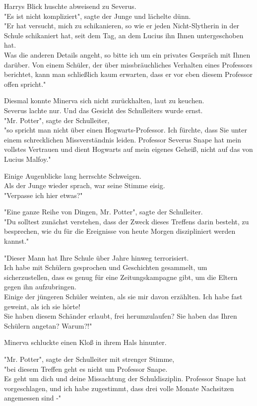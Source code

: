 {Harrys Blick huschte abweisend zu Severus.\\ "Es ist nicht kompliziert", sagte der Junge und lächelte dünn.\\ "Er hat versucht, mich zu schikanieren, so wie er jeden Nicht-Slytherin in der Schule schikaniert hat, seit dem Tag, an dem Lucius ihn Ihnen untergeschoben hat.\\ Was die anderen Details angeht, so bitte ich um ein privates Gespräch mit Ihnen darüber. Von einem Schüler, der über missbräuchliches Verhalten eines Professors berichtet, kann man schließlich kaum erwarten, dass er vor eben diesem Professor offen spricht."

Diesmal konnte Minerva sich nicht zurückhalten, laut zu keuchen.\\ Severus lachte nur. Und das Gesicht des Schulleiters wurde ernst.\\ "Mr. Potter", sagte der Schulleiter,\\ "so spricht man nicht über einen Hogwarts-Professor. Ich fürchte, dass Sie unter einem schrecklichen Missverständnis leiden. Professor Severus Snape hat mein vollstes Vertrauen und dient Hogwarts auf mein eigenes Geheiß, nicht auf das von Lucius Malfoy."

Einige Augenblicke lang herrschte Schweigen.\\ Als der Junge wieder sprach, war seine Stimme eisig.\\ "Verpasse ich hier etwas?"

"Eine ganze Reihe von Dingen, Mr. Potter", sagte der Schulleiter.\\ "Du solltest zunächst verstehen, dass der Zweck dieses Treffens darin besteht, zu besprechen, wie du für die Ereignisse von heute Morgen diszipliniert werden kannst."

"Dieser Mann hat Ihre Schule über Jahre hinweg terrorisiert.\\ Ich habe mit Schülern gesprochen und Geschichten gesammelt, um sicherzustellen, dass es genug für eine Zeitungskampagne gibt, um die Eltern gegen ihn aufzubringen.\\ Einige der jüngeren Schüler weinten, als sie mir davon erzählten. Ich habe fast geweint, als ich sie hörte!\\ Sie haben diesem Schänder erlaubt, frei herumzulaufen? Sie haben das Ihren Schülern angetan? Warum?!"

Minerva schluckte einen Kloß in ihrem Hals hinunter.

"Mr. Potter", sagte der Schulleiter mit strenger Stimme,\\ "bei diesem Treffen geht es nicht um Professor Snape.\\ Es geht um dich und deine Missachtung der Schuldisziplin. Professor Snape hat vorgeschlagen, und ich habe zugestimmt, dass drei volle Monate Nachsitzen angemessen sind -"

}
